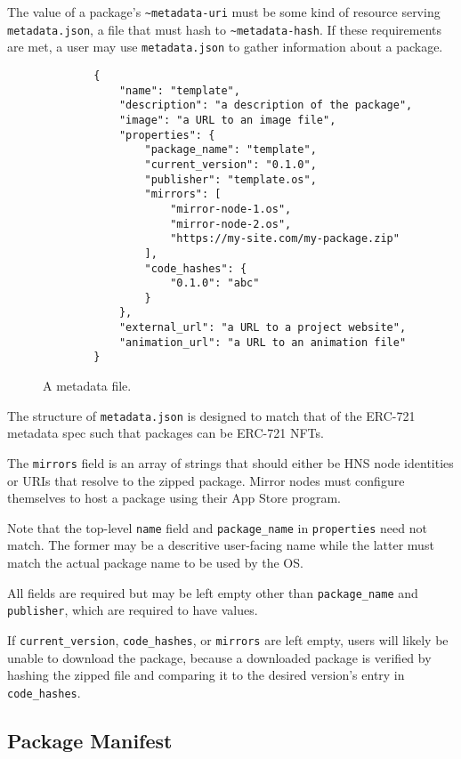 \documentclass[runningheads]{llncs}
\begin{document}
The value of a package's \verb|~metadata-uri| must be some kind of resource serving \verb|metadata.json|, a file that must hash to \verb|~metadata-hash|.
If these requirements are met, a user may use \verb|metadata.json| to gather information about a package.

\begin{figure}[H]
    \centering
    \begin{verbatim}
        {
            "name": "template",
            "description": "a description of the package",
            "image": "a URL to an image file",
            "properties": {
                "package_name": "template",
                "current_version": "0.1.0",
                "publisher": "template.os",
                "mirrors": [
                    "mirror-node-1.os",
                    "mirror-node-2.os",
                    "https://my-site.com/my-package.zip"
                ],
                "code_hashes": {
                    "0.1.0": "abc"
                }
            },
            "external_url": "a URL to a project website",
            "animation_url": "a URL to an animation file"
        }
    \end{verbatim}
    \caption{A metadata file.}
    \label{fig:example metadata.json}
\end{figure}

The structure of \verb|metadata.json| is designed to match that of the ERC-721 metadata spec such that packages can be ERC-721 NFTs.

The \verb|mirrors| field is an array of strings that should either be HNS node identities or URIs that resolve to the zipped package.
Mirror nodes must configure themselves to host a package using their App Store program.

Note that the top-level \verb|name| field and \verb|package_name| in \verb|properties| need not match. The former may be a descritive user-facing name while the latter must match the actual package name to be used by the OS.

All fields are required but may be left empty other than \verb|package_name| and \verb|publisher|, which are required to have values.

If \verb|current_version|, \verb|code_hashes|, or \verb|mirrors| are left empty, users will likely be unable to download the package, because a downloaded package is verified by hashing the zipped file and comparing it to the desired version's entry in \verb|code_hashes|.

\subsection{Package Manifest}
\label{sec:packagemanagermanifest}
\end{document}
